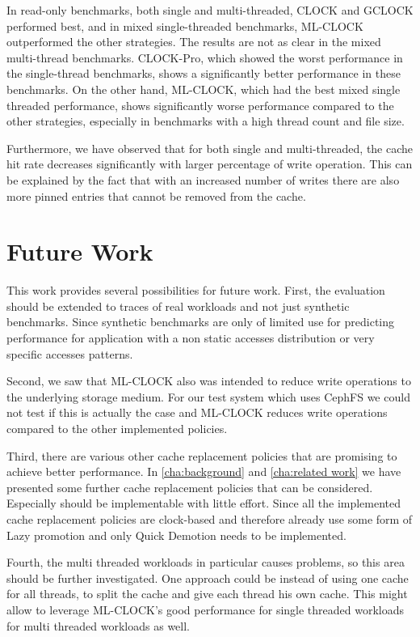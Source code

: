\documentclass[
	12pt,
	a4paper,
	abstract,
	bibliography=totoc,
	chapterprefix,
	headings=openright,
	numbers=endperiod,
	parskip=half,
	twoside,
]{scrreprt}
\begin{document}
In read-only benchmarks, both single and multi-threaded, CLOCK and GCLOCK performed best, 
and in mixed single-threaded benchmarks, ML-CLOCK outperformed the other strategies. 
The results are not as clear in the mixed multi-thread benchmarks.
CLOCK-Pro, which showed the worst performance in the single-thread benchmarks, shows a significantly 
better performance in these benchmarks.
On the other hand, ML-CLOCK, which had the best mixed single threaded performance, 
shows significantly worse performance compared to the other strategies, especially in benchmarks 
with a high thread count and file size.

Furthermore, we have observed that for both single and multi-threaded, 
the cache hit rate decreases significantly with larger percentage of write operation.
This can be explained by the fact that with an increased number of writes there are 
also more pinned entries that cannot be removed from the cache.

\section{Future Work}

This work provides several possibilities for future work.
First, the evaluation should be extended to traces of real workloads and not just synthetic benchmarks.
Since synthetic benchmarks are only of limited use for predicting performance for  
application with a non static accesses distribution or very specific accesses patterns.

Second, we saw that ML-CLOCK also was intended to reduce write operations to the underlying storage medium.
For our test system which uses CephFS we could not test if this is actually the case and ML-CLOCK reduces write operations
compared to the other implemented policies.

Third, there are various other cache replacement policies that are promising to achieve better performance.
In \cref{cha:background} and \cref{cha:related work} we have presented some further cache replacement policies that can be considered.
Especially \cite{yang2023fifo} should be implementable with little effort.
Since all the implemented cache replacement policies are clock-based and therefore already use some form of Lazy promotion and 
only Quick Demotion needs to be implemented.

Fourth, the multi threaded workloads in particular causes problems, so this area should be further investigated.
One approach could be instead of using one cache for all threads, to split the cache and give each thread his own cache.
This might allow to leverage ML-CLOCK's good performance for single threaded workloads for multi threaded workloads as well.
\end{document}
